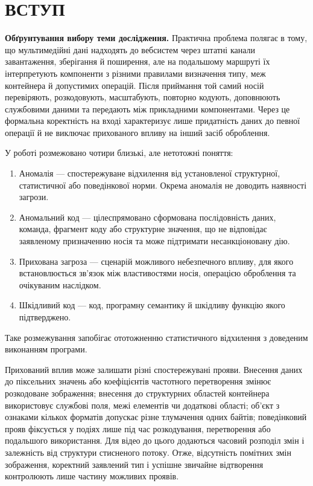 \chapter*{ВСТУП}
{}

\textbf{Обґрунтування вибору теми дослідження.}
Практична проблема полягає в тому, що мультимедійні дані надходять до вебсистем через штатні канали завантаження, зберігання й поширення, але на подальшому маршруті їх інтерпретують компоненти з різними правилами визначення типу, меж контейнера й допустимих операцій. Після приймання той самий носій перевіряють, розкодовують, масштабують, повторно кодують, доповнюють службовими даними та передають між прикладними компонентами. Через це формальна коректність на вході характеризує лише придатність даних до певної операції й не виключає прихованого впливу на інший засіб оброблення.

У роботі розмежовано чотири близькі, але нетотожні поняття:

\begin{enumerate}[label=\arabic*),leftmargin=1.1cm]
\item Аномалія --- спостережуване відхилення від установленої структурної, статистичної або поведінкової норми. Окрема аномалія не доводить наявності загрози.
\item Аномальний код --- цілеспрямовано сформована послідовність даних, команда, фрагмент коду або структурне значення, що не відповідає заявленому призначенню носія та може підтримати несанкціоновану дію.
\item Прихована загроза --- сценарій можливого небезпечного впливу, для якого встановлюється зв’язок між властивостями носія, операцією оброблення та очікуваним наслідком.
\item Шкідливий код --- код, програмну семантику й шкідливу функцію якого підтверджено.
\end{enumerate}

Таке розмежування запобігає ототожненню статистичного відхилення з доведеним виконанням програми.

Прихований вплив може залишати різні спостережувані прояви. Внесення даних до піксельних значень або коефіцієнтів частотного перетворення змінює розкодоване зображення; внесення до структурних областей контейнера використовує службові поля, межі елементів чи додаткові області; об’єкт з ознаками кількох форматів допускає різне тлумачення одних байтів; поведінковий прояв фіксується у подіях лише під час розкодування, перетворення або подальшого використання. Для відео до цього додаються часовий розподіл змін і залежність від структури стисненого потоку. Отже, відсутність помітних змін зображення, коректний заявлений тип і успішне звичайне відтворення контролюють лише частину можливих проявів.

